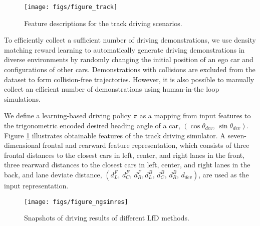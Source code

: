 \documentclass[letterpaper, 10 pt, conference]{ieeeconf}  %
\begin{document}
\begin{figure}[!t] \centering
	\texttt{[image: figs/figure\_track]}
	\caption{
		Feature descriptions for the track driving scenarios. 
		}
	\label{fig:trackfeat}
\end{figure}



To efficiently collect a sufficient number of driving demonstrations, 
we use density matching reward learning \cite{SJChoi_16_DMRL}
to automatically generate driving demonstrations 
in diverse environments by randomly changing
the initial position of an ego car 
and configurations of other cars. 
Demonstrations with collisions are excluded from the dataset
to form collision-free trajectories. 
However, it is also possible to manually collect an efficient number
of demonstrations using human-in-the loop simulations. 


We define a learning-based driving policy $\pi$ 
as a mapping from input features to the trigonometric encoded
desired heading angle of a car, 
$(\cos\theta_{dev} , \, \sin \theta_{dev})$.
Figure \ref{fig:trackfeat} illustrates obtainable features of the
track driving simulator.
A seven-dimensional frontal and rearward feature representation, 
which consists of three frontal distances to the closest cars in left, center,
and right lanes in the front, 
three rearward distances to the closest cars in left, center, and right lanes in the back,
and lane deviate distance,
$(d^F_L, \, d^F_C, \, d^F_R, d^B_L, \, d^B_C, \, d^B_R, \, d_{dev})$,
are used as the input representation. 

\begin{figure*}[!t] \centering
	\texttt{[image: figs/figure\_ngsimres]}
	\caption{
		Snapshots of driving results of different LfD methods.  
		}
	\label{fig:ngsimres}
\end{figure*}
\end{document}

